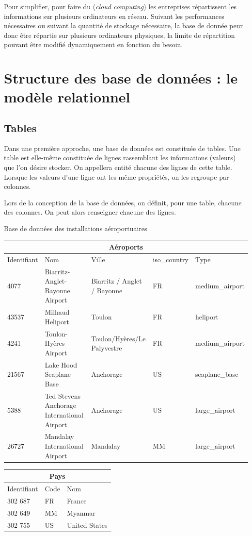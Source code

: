 \documentclass[10pt]{article}
\begin{document}
Pour simplifier, pour faire du (\textit{cloud computing}) les entreprises répartissent les informations sur plusieurs ordinateurs en réseau. Suivant les performances nécessaires ou suivant la quantité de stockage nécessaire, la base de donnée peur donc être répartie sur plusieurs ordinateurs physiques, la limite de répartition pouvant être modifié dynamiquement en fonction du besoin. 

\section{Structure des base de données : le modèle relationnel}
\subsection{Tables}
Dans une première approche, une base de données est constituée de tables. Une table est elle-même constituée de lignes rassemblant les informations (valeurs) que l'on désire stocker. On appellera entité chacune des lignes de cette table. Lorsque les valeurs d'une ligne ont les même propriétés, on les regroupe par colonnes. 

Lors de la conception de la base de données, on définit, pour une table, chacune des colonnes. On peut alors renseigner chacune des lignes. 

\begin{exemple}
Base de données des installations aéroportuaires
\begin{center}
\begin{tabular}{lp{4cm}p{3cm}ll}
\hline
\multicolumn{5}{c}{Aéroports} \\
\hline
Identifiant & Nom & Ville & iso\_country & Type \\
\hline
\hline
4077 &Biarritz-Anglet-Bayonne Airport & Biarritz / Anglet / Bayonne & FR &  medium\_airport \\
43537 &Milhaud Heliport & Toulon & FR  & heliport \\
4241 &Toulon-Hyères Airport & Toulon/Hyères/Le Palyvestre & FR &  medium\_airport \\
21567 &Lake Hood Seaplane Base & Anchorage & US &   seaplane\_base\\
5388 &Ted Stevens Anchorage International Airport & Anchorage & US & large\_airport\\
26727 &Mandalay International Airport & Mandalay & MM  & large\_airport\\
\hline
\end{tabular}
\end{center}

\begin{center}
\begin{tabular}{lll}
\hline
\multicolumn{3}{c}{Pays} \\
\hline
Identifiant & Code & Nom \\
\hline
\hline
302 687 & FR & France \\
302 649 & MM & Myanmar \\
302 755 & US & United States \\
\hline
\end{tabular}
\end{center}
\end{exemple}
\end{document}
